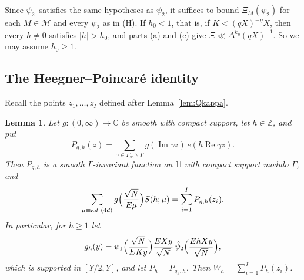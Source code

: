 \documentclass[11pt]{amsart}
\newtheorem{lemma}[theorem]{Lemma}
\theoremstyle{remark}
\theoremstyle{definition}
\numberwithin{equation}{section}
\newcommand{\Mset}{\mathcal{M}}
\newcommand{\Z}{\mathbb{Z}}
\newcommand{\C}{\mathbb{C}}
\newcommand{\Hb}{\mathbb{H}}
\begin{document}
Since $\psi_2^-$ satisfies the same hypotheses as $\psi_2$, it suffices to bound $\Xi_M(\psi_2)$ for each $M\in\Mset$ and every $\psi_2$ as in \textup{(H)}. If $h_0<1$, that is, if $K<(qX)^{-\eta}X$, then every $h\ne0$ satisfies $|h|>h_0$, and parts (a) and (c) give $\Xi\ll\Delta^{k_\eta}(qX)^{-1}$. So we may assume $h_0\ge1$.

\subsection{The Heegner--Poincar\'e identity}
Recall the points $z_1,\dots,z_I$ defined after Lemma~\ref{lem:Qkappa}.

\begin{lemma}\label{lem:HP}
Let $g:(0,\infty)\to\C$ be smooth with compact support, let $h\in\Z$, and put
\[
P_{g,h}(z)=\sum_{\gamma\in\Gamma_\infty\backslash\Gamma}g(\operatorname{Im}\gamma z)\,e(h\operatorname{Re}\gamma z).
\]
Then $P_{g,h}$ is a smooth $\Gamma$-invariant function on $\Hb$ with compact support modulo $\Gamma$, and
\begin{equation}\label{eq:HP}
\sum_{\mu\equiv\kappa d\ (4d)}g\Bigl(\frac{\sqrt N}{E\mu}\Bigr)S(h;\mu)=\sum_{i=1}^IP_{g,h}(z_i).
\end{equation}
In particular, for $h\ge1$ let
\begin{equation}\label{eq:gh}
g_h(y)=\psi_1\Bigl(\frac{\sqrt N}{EKy}\Bigr)\frac{EXy}{\sqrt N}\,\hat\psi_2\Bigl(\frac{EhXy}{\sqrt N}\Bigr),
\end{equation}
which is supported in $[Y/2,Y]$, and let $P_h=P_{g_h,h}$. Then $W_h=\sum_{i=1}^IP_h(z_i)$.
\end{lemma}
\end{document}
